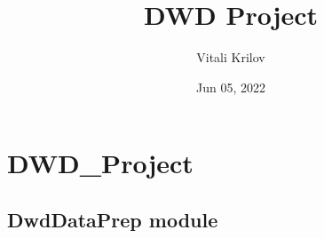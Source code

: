 \documentclass[letterpaper,10pt,english]{sphinxmanual}
\title{DWD Project}
\date{Jun 05, 2022}
\author{Vitali Krilov}
\begin{document}
\pagestyle{empty}
\sphinxmaketitle
\pagestyle{plain}
\sphinxtableofcontents
\pagestyle{normal}
\label{\detokenize{index::doc}}



\chapter{DWD\_Project}
\label{\detokenize{modules:dwd-project}}\label{\detokenize{modules::doc}}

\section{DwdDataPrep module}
\label{\detokenize{DwdDataPrep:module-DwdDataPrep}}\label{\detokenize{DwdDataPrep:dwddataprep-module}}\label{\detokenize{DwdDataPrep::doc}}
\end{document}
